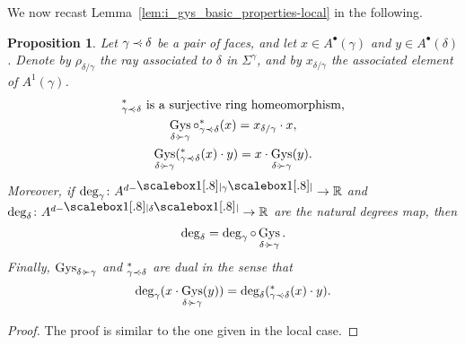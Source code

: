 \documentclass[11pt]{amsart}
\newtheorem{prop}[thm]{Proposition}
\theoremstyle{definition}
\numberwithin{equation}{section}
\renewcommand{\~}{\widetilde}
\newcommand{\R}{\mathbb{R}}
\newcommand{\bul}{\bullet} %
\DeclareMathOperator{\gys}{Gys} %
\let\i\relax
\newcommand{\i}{{\mathop{}\mathrm{i}}} %
\newcommand{\dimsaux}[2]{\raisebox{.2ex}{\scalebox{1}[.8]{$#1\lvert$}}#2\raisebox{.2ex}{\scalebox{1}[.8]{$#1\rvert$}}}
\newcommand{\dims}[1]{\mathpalette\dimsaux{#1}}
\newcommand{\subface}{\prec}
\newcommand{\ssubface}{\mathbin{\mathchoice
  {\subface\!\!\!\cdot}%
  {\subface\!\!\!\cdot}%
  {\subface\!\cdot}%
  {\subface\!\cdot}%
}} %
\newcommand{\supface}{\succ}
\newcommand{\ssupface}{\mathbin{\mathchoice
  {\cdot\!\!\!\supface}%
  {\cdot\!\!\!\supface}%
  {\cdot\!\supface}%
  {\cdot\!\supface}%
}}
\begin{document}
We now recast Lemma~\ref{lem:i_gys_basic_properties-local} in the following.

\begin{prop} \label{lem:i_gys_basic_properties}
Let $\gamma\ssubface\delta$ be a pair of faces, and let $x\in A^\bul(\gamma)$ and $y\in A^\bul(\delta)$. Denote by $\rho_{\delta/\gamma}$ the ray associated to $\delta$ in $\Sigma^\gamma$, and by $x_{\delta/\gamma}$ the associated element of $A^1(\gamma)$.
\begin{gather}
\text{$\i^*_{\gamma\ssubface\delta}$ is a surjective ring homeomorphism,} \label{eqn:i_surjective_homeo} \\
\gys_{\delta\ssupface\gamma}\circ\i^*_{\gamma\ssubface \delta}(x)=x_{\delta/\gamma}\cdot x, \label{eqn:gys_circ_i} \\
\gys_{\delta\ssupface\gamma}(\i^*_{\gamma\ssubface\delta}(x)\cdot y)=x\cdot\gys_{\delta\ssupface\gamma}(y). \label{eqn:gys_i_simplification}
\end{gather}
Moreover, if $\deg_\gamma\colon A^{d-\dims\gamma}\to\R$ and $\deg_\delta\colon A^{d-\dims\delta}\to\R$ are the natural degrees map, then
\begin{equation} \label{eqn:deg_circ_gys}
\deg_\delta=\deg_\gamma\circ\gys_{\delta\ssupface\gamma}.
\end{equation}
Finally, $\gys_{\delta\ssupface\gamma}$ and $\i^*_{\gamma\ssubface\delta}$ are dual in the sense that
\begin{equation} \label{eqn:i_gys_dual}
\deg_\gamma(x\cdot\gys_{\delta\ssupface\gamma}(y))=\deg_\delta(\i^*_{\gamma\ssubface\delta}(x)\cdot y).
\end{equation}
\end{prop}

\begin{proof} The proof is similar to the one given in the local case.
\end{proof}

\medskip
\end{document}
